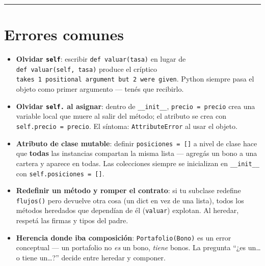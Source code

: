 \documentclass[
  spanish,
  letterpaper,
  DIV=11,
  numbers=noendperiod]{scrreprt}
\providecommand{\tightlist}{%
  \setlength{\itemsep}{0pt}\setlength{\parskip}{0pt}}
\begin{document}
\begin{center}\rule{0.5\linewidth}{0.5pt}\end{center}

\section{Errores comunes}\label{errores-comunes-2}

\begin{tcolorbox}[enhanced jigsaw, bottomrule=.15mm, colback=white, opacitybacktitle=0.6, arc=.35mm, toprule=.15mm, opacityback=0, breakable, titlerule=0mm, left=2mm, coltitle=black, colbacktitle=quarto-callout-warning-color!10!white, colframe=quarto-callout-warning-color-frame, leftrule=.75mm, toptitle=1mm, bottomtitle=1mm, title=\textcolor{quarto-callout-warning-color}{\faExclamationTriangle}\hspace{0.5em}{Trampas frecuentes}, rightrule=.15mm]

\begin{itemize}
\tightlist
\item
  \textbf{Olvidar \texttt{self}}: escribir \texttt{def\ valuar(tasa)} en
  lugar de \texttt{def\ valuar(self,\ tasa)} produce el críptico
  \texttt{takes\ 1\ positional\ argument\ but\ 2\ were\ given}. Python
  siempre pasa el objeto como primer argumento --- tenés que recibirlo.
\item
  \textbf{Olvidar \texttt{self.} al asignar}: dentro de
  \texttt{\_\_init\_\_}, \texttt{precio\ =\ precio} crea una variable
  local que muere al salir del método; el atributo se crea con
  \texttt{self.precio\ =\ precio}. El síntoma: \texttt{AttributeError}
  al usar el objeto.
\item
  \textbf{Atributo de clase mutable}: definir
  \texttt{posiciones\ =\ {[}{]}} a nivel de clase hace que
  \textbf{todas} las instancias compartan la misma lista --- agregás un
  bono a una cartera y aparece en todas. Las colecciones siempre se
  inicializan en \texttt{\_\_init\_\_} con
  \texttt{self.posiciones\ =\ {[}{]}}.
\item
  \textbf{Redefinir un método y romper el contrato}: si tu subclase
  redefine \texttt{flujos()} pero devuelve otra cosa (un dict en vez de
  una lista), todos los métodos heredados que dependían de él
  (\texttt{valuar}) explotan. Al heredar, respetá las firmas y tipos del
  padre.
\item
  \textbf{Herencia donde iba composición}: \texttt{Portafolio(Bono)} es
  un error conceptual --- un portafolio no \emph{es} un bono,
  \emph{tiene} bonos. La pregunta ``¿es un\ldots{} o tiene un\ldots?''
  decide entre heredar y componer.
\end{itemize}

\end{tcolorbox}
\end{document}
